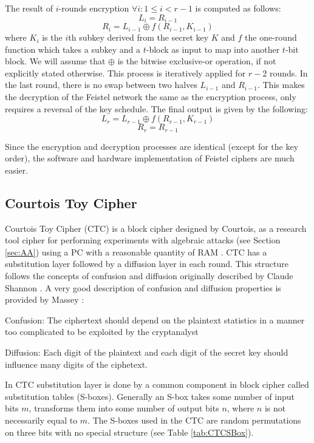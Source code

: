 The result of $i$-rounds encryption $\forall i : 1 \leq i < r - 1 $ is computed as follows:
$$ L_{i} = R_{i-1}$$
$$ R_{i} = L_{i-1} \oplus f(R_{i-1},K_{i-1})$$
where $K_{i}$ is the $i$th subkey derived from the secret key $K$ and $f$ the one-round function which takes a subkey and a $t$-block as input to map into another $t$-bit block. We will assume that $\oplus$ is the bitwise exclusive-or operation, if not explicitly stated otherwise. This process is iteratively applied for $r - 2$ rounds. In the last round, there is no swap between two halves $L_{i-1}$ and $R_{i-1}$. This makes the decryption of the Feistel network the same as the encryption process, only requires a reversal of the key schedule. The final output is given by the following: $$ L_{r} = L_{r-1} \oplus f(R_{r-1},K_{r-1})$$
$$R_{r} = R_{r-1}$$

Since the encryption and decryption processes are identical (except for the key order), the software and hardware implementation of Feistel ciphers are much easier.

\subsection{Courtois Toy Cipher}
Courtois Toy Cipher (CTC) is a block cipher designed by Courtois, as a research tool
cipher for performing experiments with algebraic attacks (see Section \ref{sec:AA}) using a PC with a reasonable quantity of RAM \cite{FastAlg}.
CTC has a substitution layer followed by a diffusion layer in each round. This structure follows the concepts of confusion and diffusion originally described by Claude
Shannon \cite{shannon1949communication}. A very good description of confusion and diffusion properties is provided by Massey \cite{kaliski1995montgomery}:

Confusion: The ciphertext should depend on the plaintext statistics in a manner
too complicated to be exploited by the cryptanalyst

Diffusion: Each digit of the plaintext and each digit of the secret key should
influence many digits of the ciphetext.

In CTC substitution layer is done by a common component in block cipher called substitution tables (S-boxes). Generally an S-box takes some number of input bits $m$, transforms them into some number of output bits $n$, where $n$ is not necessarily equal to $m$. The S-boxes used in the CTC are random
permutations on three bits with no special structure (see Table \ref{tab:CTCSBox}).


